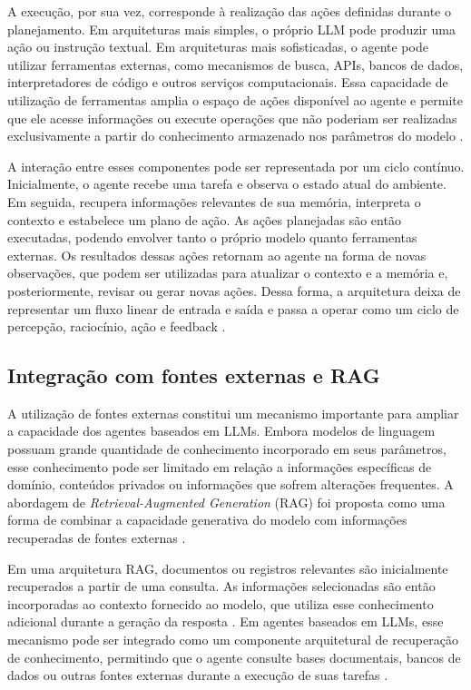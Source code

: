 A execução, por sua vez, corresponde à realização das ações definidas durante o planejamento. Em arquiteturas mais simples, o próprio LLM pode produzir uma ação ou instrução textual. Em arquiteturas mais sofisticadas, o agente pode utilizar ferramentas externas, como mecanismos de busca, APIs, bancos de dados, interpretadores de código e outros serviços computacionais. Essa capacidade de utilização de ferramentas amplia o espaço de ações disponível ao agente e permite que ele acesse informações ou execute operações que não poderiam ser realizadas exclusivamente a partir do conhecimento armazenado nos parâmetros do modelo \cite{zhao2026survey}.

A interação entre esses componentes pode ser representada por um ciclo contínuo. Inicialmente, o agente recebe uma tarefa e observa o estado atual do ambiente. Em seguida, recupera informações relevantes de sua memória, interpreta o contexto e estabelece um plano de ação. As ações planejadas são então executadas, podendo envolver tanto o próprio modelo quanto ferramentas externas. Os resultados dessas ações retornam ao agente na forma de novas observações, que podem ser utilizadas para atualizar o contexto e a memória e, posteriormente, revisar ou gerar novas ações. Dessa forma, a arquitetura deixa de representar um fluxo linear de entrada e saída e passa a operar como um ciclo de percepção, raciocínio, ação e feedback \cite{muller1999,cheng2026,zhao2026survey}.

\subsection{Integração com fontes externas e RAG}

A utilização de fontes externas constitui um mecanismo importante para ampliar a capacidade dos agentes baseados em LLMs. Embora modelos de linguagem possuam grande quantidade de conhecimento incorporado em seus parâmetros, esse conhecimento pode ser limitado em relação a informações específicas de domínio, conteúdos privados ou informações que sofrem alterações frequentes. A abordagem de \textit{Retrieval-Augmented Generation} (RAG) foi proposta como uma forma de combinar a capacidade generativa do modelo com informações recuperadas de fontes externas \cite{lewis2020rag}.

Em uma arquitetura RAG, documentos ou registros relevantes são inicialmente recuperados a partir de uma consulta. As informações selecionadas são então incorporadas ao contexto fornecido ao modelo, que utiliza esse conhecimento adicional durante a geração da resposta \cite{lewis2020rag}. Em agentes baseados em LLMs, esse mecanismo pode ser integrado como um componente arquitetural de recuperação de conhecimento, permitindo que o agente consulte bases documentais, bancos de dados ou outras fontes externas durante a execução de suas tarefas \cite{zhao2026survey}.

